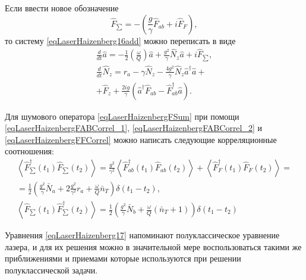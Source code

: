 Если ввести новое обозначение 
\begin{equation}
\hat{F}_{\sum} = - \left(\frac{g}{\gamma}\hat{F}_{ab} + i \hat{F}_F\right),
\label{eqLaserHaizenbergFSum}
\end{equation}
то систему 
\eqref{eqLaserHaizenberg16add} можно переписать в виде
\begin{eqnarray}
\frac{d}{dt} \hat{a} = -
\frac{1}{2}\left(\frac{\omega}{Q}\right)\hat{a} + \frac{g^2}{\gamma}
\hat{N}_z\hat{a} + i \hat{F}_{\sum},
\nonumber \\
\frac{d}{dt}\hat{N}_z = r_a -
\gamma\hat{N}_z - \frac{4g^2}{\gamma}
\hat{N}_z\hat{a}^{\dag}\hat{a} +
\nonumber \\
+ \hat{F}_z + \frac{2ig}{\gamma} \left(\hat{a}^{\dag}\hat{F}_{ab} -
\hat{F}_{ab}^{\dag}\hat{a}\right).
\label{eqLaserHaizenberg17}
\end{eqnarray}

Для шумового оператора \eqref{eqLaserHaizenbergFSum} при помощи
\eqref{eqLaserHaizenbergFABCorrel_1},
\eqref{eqLaserHaizenbergFABCorrel_2} и
\eqref{eqLaserHaizenbergFFCorrel} 
можно написать следующие корреляционные соотношения:
\begin{eqnarray}
\left<\hat{F}^{\dag}_{\sum}\left(t_1\right)\hat{F}_{\sum}\left(t_2\right)\right>
=
\frac{g^2}{\gamma^2}\left<\hat{F}^{\dag}_{ab}\left(t_1\right)\hat{F}_{ab}\left(t_2\right)\right>
+
\left<\hat{F}^{\dag}_{F}\left(t_1\right)\hat{F}_{F}\left(t_2\right)\right>
= 
\nonumber \\
= 
\frac{1}{2}
\left(
\frac{g^2}{\gamma}\bar{N}_a + 2 \frac{g^2}{\gamma^2}r_a + 
\frac{\omega}{Q}\bar{n}_T
\right)
\delta\left(t_1 - t_2\right),
\nonumber \\
\left<\hat{F}_{\sum}\left(t_1\right)\hat{F}^{\dag}_{\sum}\left(t_2\right)\right>
= \frac{1}{2}
\left(
\frac{g^2}{\gamma}\bar{N}_b + 
\frac{\omega}{Q}\left(\bar{n}_T + 1\right)
\right)
\delta\left(t_1 - t_2\right)
\label{eqLaserHaizenbergFSumCorrel}
\end{eqnarray}


Уравнения \eqref{eqLaserHaizenberg17} напоминают полуклассическое
уравнение лазера, и для их решения можно в значительной мере
воспользоваться такими же приближениями и приемами которые
используются при решении полуклассической задачи.






